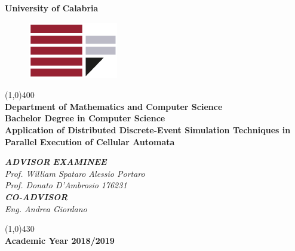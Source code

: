 \documentclass[12pt,a4paper,fleqn]{report}
\begin{document}
\begin{titlepage}
\begin{center}
\huge{\textbf{University of Calabria}}\\
\begin{figure}[bt]
\centering
\includegraphics[scale=0.5]{Stemma}\\
\end{figure}
\line(1,0){400}\\[5mm]
\Large{\textbf{Department of Mathematics and Computer Science}}\\
\Large{\textbf{Bachelor Degree in Computer Science}}\\
\vspace{35mm}
\Huge{\textbf{Application of Distributed Discrete-Event Simulation Techniques in Parallel Execution of Cellular Automata}}
\end{center}
\vspace{35mm}
\begin{flushleft}
\large{\textsc{\textit{\textbf{ADVISOR}}}}
\hfill \large{\textit{\textsc{\textbf{EXAMINEE}}}}\\
\Large{\textit{Prof. William Spataro}}
\hfill \Large{\textit{Alessio Portaro}}\\
\Large{\textit{Prof. Donato D'Ambrosio}}
\hfill \Large{\textit{176231}}\\
\large{\textsc{\textit{\textbf{CO-ADVISOR}}}}\\
\Large{\textit{Eng. Andrea Giordano}}
\end{flushleft}
\vfill
\begin{center}
\line(1,0){430}\\[5mm]
{\large{\bf Academic Year 2018/2019}}\\
\end{center}
\end{titlepage}
\newpage
\thispagestyle{empty}
\tableofcontents
\thispagestyle{empty}

\newpage
\setcounter{page}{1}
\end{document}
